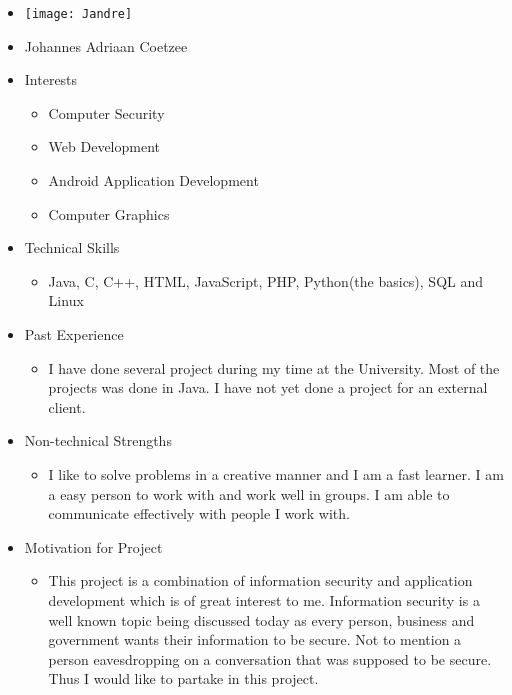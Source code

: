 
\begin{itemize}
	\item[] \texttt{[image: Jandre]}
	\item[] Johannes Adriaan Coetzee
	\item Interests
	\begin{itemize}
		\item Computer Security
		\item Web Development
		\item Android Application Development
		\item Computer Graphics
	\end{itemize}
	\item Technical Skills
	\begin{itemize}
		\item[] Java, C, C++, HTML, JavaScript, PHP, Python(the basics), SQL and Linux 
	\end{itemize}
	\item Past Experience
	\begin{itemize}
		\item[] I have done several project during my time at the University. Most of the projects was done in Java. I have not yet done a project for an external client.
	\end{itemize}
	\item Non-technical Strengths
	\begin{itemize}
		\item[] I like to solve problems in a creative manner and I am a fast learner. I am a easy person to work with and work well in groups. I am able to communicate effectively with people I work with.
	\end{itemize}
	\item Motivation for Project
	\begin{itemize}
		\item[] This project is a combination of information security and application development which is of great interest to me. Information security is a well known topic being discussed today as every person, business and government wants their information to be secure. Not to mention a person eavesdropping on a conversation that was supposed to be secure. Thus I would like to partake in this project. 
	\end{itemize}
\end{itemize}